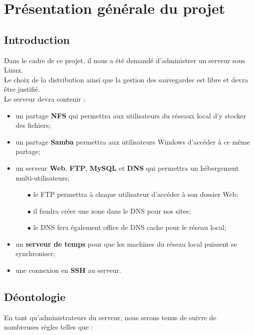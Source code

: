 \section{Présentation générale du projet}
\label{sec:pres-gener-du}


\subsection{Introduction}
\label{subsec:introduction}

Dans le cadre de ce projet, il nous a été demandé d'administrer un serveur sous
Linux. \\
Le choix de la distribution ainsi que la gestion des sauvegardes est libre et
devra être justifié. \\

Le serveur devra contenir :

\begin{itemize}
    \item un partage \textbf{NFS} qui permettra aux utilisateurs du réseaux local d'y stocker des fichiers;
    \item un partage \textbf{Samba} permettra aux utilisateurs Windows d'accéder à ce même partage;
    \item un serveur \textbf{Web}, \textbf{FTP}, \textbf{MySQL} et \textbf{DNS} qui permettra un hébergement multi-utilisateurs;
    \begin{itemize}
        \item[$\bullet$] le FTP permettra à chaque utilisateur d'accéder à son dossier Web;
        \item[$\bullet$] il faudra créer une zone dans le DNS pour nos sites;
        \item[$\bullet$] le DNS fera également office de DNS cache pour le réseau local;
    \end{itemize}
    \item un \textbf{serveur de temps} pour que les machines du
    réseau local puissent se synchroniser;
    \item une connexion en \textbf{SSH} au serveur.
\end{itemize}


\newpage


\subsection{Déontologie}
\label{subsec:déontologie}

En tant qu'administrateurs du serveur, nous serons tenus de suivre de nombreuses
règles telles que :

